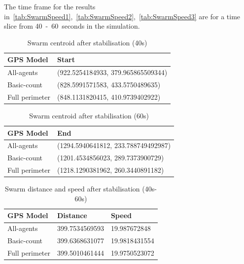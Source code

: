 The time frame for the results in~\autoref{tab:SwarmSpeed1},~\autoref{tab:SwarmSpeed2},~\autoref{tab:SwarmSpeed3} are for a time slice from 40~-~60~seconds in the simulation.

\begin{table}[H]
\begin{center}
\begin{tabular}{| l | l |}
\hline
GPS Model & Start \\ \hline
All-agents & (922.5254184933, 379.965865509344) \\ \hline
Basic-count & (828.5991571583, 433.5750489635) \\ \hline
Full perimeter & (848.1131820415, 410.9739402922) \\ \hline
\end{tabular}\caption{Swarm centroid after stabilisation (40s)} \label{tab:SwarmSpeed1}
\end{center}
\end{table}

\begin{table}[H]
\begin{center}
\begin{tabular}{| l | l |}
\hline
GPS Model & End  \\ \hline
All-agents & (1294.5940641812, 233.788749492987) \\ \hline
Basic-count & (1201.4534856023, 289.7373900729) \\ \hline
Full perimeter & (1218.1290381962, 260.3440891182)\\ \hline
\end{tabular}\caption{Swarm centroid after stabilisation (60s)} \label{tab:SwarmSpeed2}
\end{center}
\end{table}

\begin{table}[H]
\begin{center}
\begin{tabular}{| l | l | l |}
\hline
GPS Model & Distance & Speed \\ \hline
All-agents &  399.7534569593 & 19.987672848 \\  \hline
Basic-count & 399.6368631077 & 19.9818431554 \\ \hline
Full perimeter & 399.5010461444 & 19.9750523072 \\  \hline
\end{tabular}\caption{Swarm distance and speed after stabilisation (40s-60s)} \label{tab:SwarmSpeed3}
\end{center}
\end{table}

